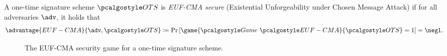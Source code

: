 \begin{definition}\label{def:euf-cma-ot}
    A one-time signature scheme $\algo{OTS}$ is \emph{EUF-CMA secure} (Existential Unforgeability under Chosen Message Attack) if for all \ppt adversaries $\adv$, it holds that
    \[
    \advantage{EUF-CMA}{\adv, \algo{OTS}} \defeq \pr{\game{\Game~\algo{EUF-CMA}}{\algo{OTS}} = 1} = \negl.
    \]
\end{definition}

\begin{figure}[tbh]
 \begin{tcolorbox}%
  \begin{pchstack}[center]
   \pchspace
  \end{pchstack}
 \end{tcolorbox}
 \caption{The EUF-CMA security game for a one-time signature scheme.}
 \label{fig:euf-cma-ots}
\end{figure}

